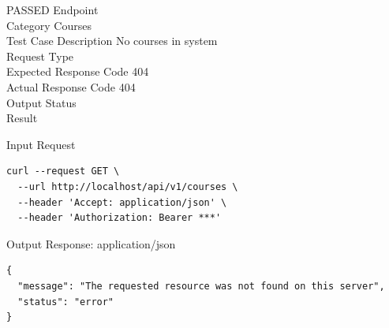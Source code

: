 \begin{testcase}{77}{PASSED}
Endpoint \hfill {}\\
Category \hfill Courses\\
Test Case Description \hfill No courses in system\\

Request Type    \hfill {}\\
Expected Response Code    \hfill 404\\
Actual Response Code    \hfill 404\\

Output Status \hfill {}\\
Result \hfill {}

\begin{ipblock}{Input Request}
\begin{verbatim}
curl --request GET \
  --url http://localhost/api/v1/courses \
  --header 'Accept: application/json' \
  --header 'Authorization: Bearer ***'
\end{verbatim}
\end{ipblock}

\begin{opblock}{Output Response: application/json}
\begin{verbatim}
{
  "message": "The requested resource was not found on this server",
  "status": "error"
}
\end{verbatim}
\end{opblock}
\end{testcase}


